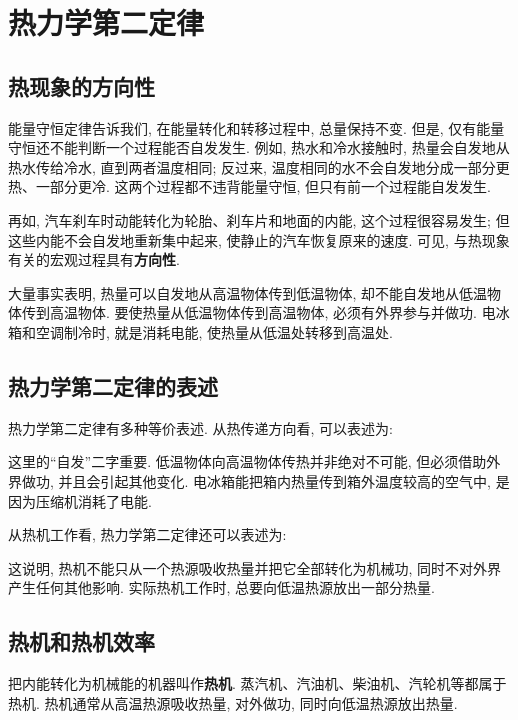 \documentclass[UTF8,openany,fontset=fandol]{ctexbook}
\theoremstyle{chinesetextbook}
\begin{document}
\section{热力学第二定律}
\subsection{热现象的方向性}
能量守恒定律告诉我们, 在能量转化和转移过程中, 总量保持不变. 但是, 仅有能量守恒还不能判断一个过程能否自发发生. 例如, 热水和冷水接触时, 热量会自发地从热水传给冷水, 直到两者温度相同; 反过来, 温度相同的水不会自发地分成一部分更热、一部分更冷. 这两个过程都不违背能量守恒, 但只有前一个过程能自发发生.

再如, 汽车刹车时动能转化为轮胎、刹车片和地面的内能, 这个过程很容易发生; 但这些内能不会自发地重新集中起来, 使静止的汽车恢复原来的速度. 可见, 与热现象有关的宏观过程具有\textbf{方向性}.

大量事实表明, 热量可以自发地从高温物体传到低温物体, 却不能自发地从低温物体传到高温物体. 要使热量从低温物体传到高温物体, 必须有外界参与并做功. 电冰箱和空调制冷时, 就是消耗电能, 使热量从低温处转移到高温处.
\subsection{热力学第二定律的表述}
热力学第二定律有多种等价表述. 从热传递方向看, 可以表述为:
\begin{center}
\end{center}

这里的“自发”二字重要. 低温物体向高温物体传热并非绝对不可能, 但必须借助外界做功, 并且会引起其他变化. 电冰箱能把箱内热量传到箱外温度较高的空气中, 是因为压缩机消耗了电能.

从热机工作看, 热力学第二定律还可以表述为:
\begin{center}
\end{center}

这说明, 热机不能只从一个热源吸收热量并把它全部转化为机械功, 同时不对外界产生任何其他影响. 实际热机工作时, 总要向低温热源放出一部分热量.
\subsection{热机和热机效率}
把内能转化为机械能的机器叫作\textbf{热机}. 蒸汽机、汽油机、柴油机、汽轮机等都属于热机. 热机通常从高温热源吸收热量, 对外做功, 同时向低温热源放出热量.
\end{document}

